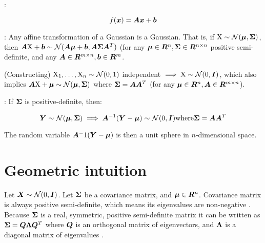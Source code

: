\begin{tcolorbox}
    \begin{defn}
    :
    
    \begin{equation}
        f({\bm{x}}) = {\bm{A}} {\bm{x}} + {\bm{b}}
    \end{equation}
    \end{defn}
    
    \begin{thm}
    : Any affine transformation of a Gaussian is a Gaussian. That is, if ${\textnormal{X}} \sim {\mathcal{N}}({\bm{\mu}}, {\bm{\Sigma}})$, then ${\bm{A}} {\textnormal{X}} + {\bm{b}} \sim {\mathcal{N}}({\bm{A}} {\bm{\mu}} + {\bm{b}}, {\bm{A}} {\bm{\Sigma}} {\bm{A}}^T)$ (for any ${\bm{\mu}} \in {\bm{R}}^n, {\bm{\Sigma}} \in {\bm{R}}^{n \times n}$ positive semi-definite, and any ${\bm{A}} \in {\bm{R}}^{m \times n}, {\bm{b}} \in {\bm{R}}^m$.
    
    (Constructing) ${\textnormal{X}}_1, \dots, {\textnormal{X}}_n \sim {\mathcal{N}}(0, 1)$ independent $\implies {\textnormal{X}} \sim {\mathcal{N}}(0, {\bm{I}})$, which also implies ${\bm{A}} {\textnormal{X}} + {\bm{\mu}} \sim {\mathcal{N}}({\bm{\mu}}, {\bm{\Sigma}})$ where ${\bm{\Sigma}} = {\bm{A}} {\bm{A}}^T$ (for any ${\bm{\mu}} \in {\bm{R}}^n, {\bm{A}} \in {\bm{R}}^{m \times n}$).
    \end{thm}
    
    \begin{thm}
    : If ${\bm{\Sigma}}$ is positive-definite, then:
    
    \begin{equation}
        {\bm{Y}} \sim {\mathcal{N}}({\bm{\mu}}, {\bm{\Sigma}}) \implies {\bm{A}}^{-1} ({\bm{Y}} - {\bm{\mu}}) \sim {\mathcal{N}}(0, {\bm{I}}) \text{where} {\bm{\Sigma}} = {\bm{A}} {\bm{A}}^T
    \end{equation}
    
    The random variable ${\bm{A}}^-1 ({\bm{Y}} - {\bm{\mu}})$ is then a unit sphere in $n$-dimensional space.
    \end{thm}
    
    \section{Geometric intuition}
    
    Let ${\bm{X}} \sim {\mathcal{N}}(0, {\bm{I}})$. Let ${\bm{\Sigma}}$ be a covariance matrix, and ${\bm{\mu}} \in {\bm{R}}^n$. Covariance matrix is always positive semi-definite, which means its eigenvalues are non-negative . Because ${\bm{\Sigma}}$ is a real, symmetric, positive semi-definite matrix it can be written as ${\bm{\Sigma}} = {\bm{Q}} {\bm{\Lambda}} {\bm{Q}}^T$ where ${\bm{Q}}$ is an orthogonal matrix of eigenvectors, and ${\bm{\Lambda}}$ is a diagonal matrix of eigenvalues .
    

\end{tcolorbox}

